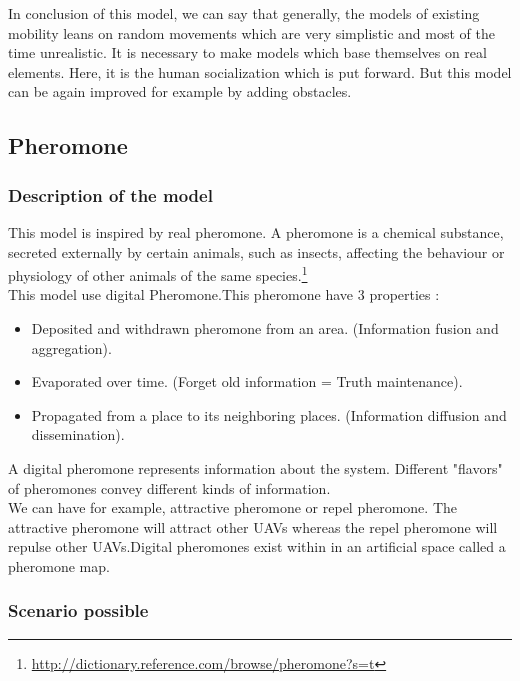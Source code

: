 In conclusion of this model, we can say that generally, the models of existing mobility leans on random movements which are very simplistic and most of the time unrealistic. It is necessary to make models which base themselves on real elements. Here, it is the human socialization which is put forward. But this model can be again improved for example by adding obstacles.

\newpage

\subsection{Pheromone}

\subsubsection{Description of the model}

This model is inspired by real pheromone. A pheromone is a chemical substance, secreted externally by certain animals, such as insects, affecting the behaviour or physiology of other animals of the same species.\footnote{\url{http://dictionary.reference.com/browse/pheromone?s=t}}\\
This model use digital Pheromone.This pheromone have 3 properties :

\begin{itemize}
\item  Deposited and withdrawn pheromone from an area. (Information fusion and aggregation).
\item  Evaporated over time. (Forget old information = Truth maintenance).
\item  Propagated from a place to its neighboring places. (Information diffusion and dissemination). 
\end{itemize}

A  digital  pheromone  represents  information  about  the  system. Different  "flavors"  of  pheromones convey different kinds of information.\\ We can have for example, attractive pheromone or repel pheromone. The attractive pheromone will attract other UAVs whereas the repel pheromone will repulse other UAVs.Digital pheromones exist within in an artificial space called a pheromone map.

\newpage

\subsubsection{Scenario possible}

